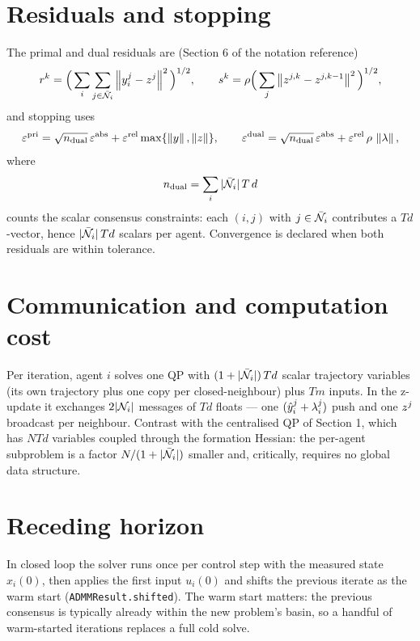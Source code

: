 \documentclass[11pt]{article}
\begin{document}
\section{Residuals and stopping}

The primal and dual residuals are (Section 6 of the notation reference)
\begin{equation}
r^k = \Big(\sum_i\sum_{j\in\bar{\mathcal{N}}_i}\left\lVert y_{i}^{j} - z^{j} \right\rVert^2\Big)^{1/2},
\qquad
s^k = \rho\Big(\sum_j \left\lVert z^{j,k} - z^{j,k-1} \right\rVert^2\Big)^{1/2},
\end{equation}
and stopping uses
\begin{equation}
\varepsilon^{\mathrm{pri}} = \sqrt{n_{\mathrm{dual}}}\,\varepsilon^{\mathrm{abs}}
+ \varepsilon^{\mathrm{rel}}\max\{\left\lVert y \right\rVert, \left\lVert z \right\rVert\},
\qquad
\varepsilon^{\mathrm{dual}} = \sqrt{n_{\mathrm{dual}}}\,\varepsilon^{\mathrm{abs}}
+ \varepsilon^{\mathrm{rel}}\,\rho\,\left\lVert \lambda \right\rVert,
\end{equation}
where
\begin{equation}
n_{\mathrm{dual}} = \sum_i |\bar{\mathcal{N}}_i|\, T\, d
\end{equation}
counts the scalar consensus constraints: each $(i,j)$ with $j \in \bar{\mathcal{N}}_i$ contributes a
$Td$-vector, hence $|\bar{\mathcal{N}}_i|\, T d$ scalars per agent. Convergence is declared when both
residuals are within tolerance.

\section{Communication and computation cost}

Per iteration, agent $i$ solves one QP with $(1 + |\bar{\mathcal{N}}_i|)\,Td$ scalar trajectory
variables (its own trajectory plus one copy per closed-neighbour) plus $Tm$ inputs. In the
z-update it exchanges $2|\mathcal{N}_i|$ messages of $Td$ floats --- one $(\hat{y}_i^j +
\lambda_{i}^{j})$ push and one $z^{j}$ broadcast per neighbour. Contrast with the
centralised QP of Section 1, which has $NTd$ variables coupled through the formation
Hessian: the per-agent subproblem is a factor $N/(1+|\bar{\mathcal{N}}_i|)$ smaller and, critically,
requires no global data structure.

\section{Receding horizon}

In closed loop the solver runs once per control step with the measured state $x_i(0)$, then
applies the first input $u_i(0)$ and shifts the previous iterate as the warm start
(\verb|ADMMResult.shifted|). The warm start matters: the previous consensus is typically
already within the new problem's basin, so a handful of warm-started iterations replaces a
full cold solve.
\end{document}
